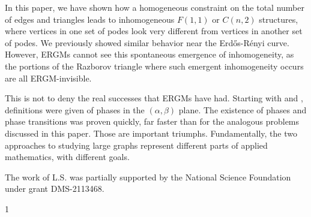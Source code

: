 \documentclass[12pt]{amsart}
\newcommand{\ER}{Erd\H{o}s-R\'enyi}
\begin{document}
{In this paper, we have shown how a homogeneous constraint on the total 
number of edges and triangles leads to inhomogeneous $F(1,1)$ or $C(n,2)$ structures, 
where vertices in one set of podes look very different from vertices in another set of podes. 
We previously showed similar behavior near the \ER{} curve. However, ERGMs cannot see this spontaneous emergence of inhomogeneity, as the portions of the
Razborov triangle where such emergent inhomogeneity occurs are all ERGM-invisible.
 
This is not to deny the real successes that ERGMs have had. Starting with \cite{CV} and \cite{CD}, definitions
were given of phases in the $(\alpha, \beta)$ plane. The existence of phases and phase transitions was proven
quickly, far faster than for the analogous problems discussed in this paper. Those are important triumphs. 
Fundamentally, the two approaches to studying large graphs  represent different parts of applied mathematics, with different goals.




\bigskip

 The work of L.S. was partially
supported by the National Science Foundation under grant DMS-2113468.

\begin{thebibliography}{1}




\end{thebibliography}}
\end{document}
